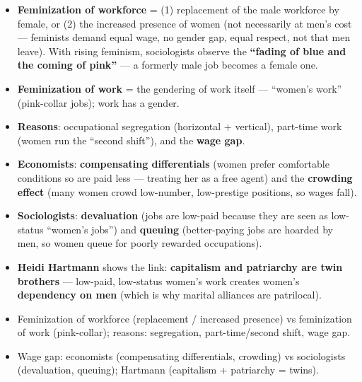 \begin{KeyConcept}
\begin{itemize}
    \item \textbf{Feminization of workforce} = (1) replacement of the male workforce by female, or (2) the increased presence of women (not necessarily at men's cost --- feminists demand equal wage, no gender gap, equal respect, not that men leave). With rising feminism, sociologists observe the \textbf{``fading of blue and the coming of pink''} --- a formerly male job becomes a female one.
    \item \textbf{Feminization of work} = the gendering of work itself --- ``women's work'' (pink-collar jobs); work has a gender.
    \item \textbf{Reasons}: occupational segregation (horizontal + vertical), part-time work (women run the ``second shift''), and the \textbf{wage gap}.
\end{itemize}
\end{KeyConcept}

\begin{KeyConcept}
\begin{itemize}
    \item \textbf{Economists}: \textbf{compensating differentials} (women prefer comfortable conditions so are paid less --- treating her as a free agent) and the \textbf{crowding effect} (many women crowd low-number, low-prestige positions, so wages fall).
    \item \textbf{Sociologists}: \textbf{devaluation} (jobs are low-paid because they are seen as low-status ``women's jobs'') and \textbf{queuing} (better-paying jobs are hoarded by men, so women queue for poorly rewarded occupations).
\end{itemize}
\end{KeyConcept}

\begin{CriticalPoint}
\begin{itemize}
    \item \textbf{Heidi Hartmann} shows the link: \textbf{capitalism and patriarchy are twin brothers} --- low-paid, low-status women's work creates women's \textbf{dependency on men} (which is why marital alliances are patrilocal).
\end{itemize}
\end{CriticalPoint}

\begin{QuickRevision}
\begin{itemize}
    \item Feminization of workforce (replacement / increased presence) vs feminization of work (pink-collar); reasons: segregation, part-time/second shift, wage gap.
    \item Wage gap: economists (compensating differentials, crowding) vs sociologists (devaluation, queuing); Hartmann (capitalism + patriarchy = twins).
\end{itemize}
\end{QuickRevision}

